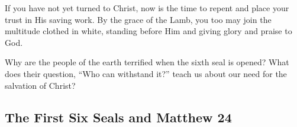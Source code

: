 If you have not yet turned to Christ, now is the time to repent and place your trust in His saving work. By the grace of the Lamb, you too may join the multitude clothed in white, standing before Him and giving glory and praise to God.

\begin{ReaderQuestion}
Why are the people of the earth terrified when the sixth seal is opened? What does their question, ``Who can withstand it?'' teach us about our need for the salvation of Christ?
\end{ReaderQuestion}

\subsection*{The First Six Seals and Matthew 24}

